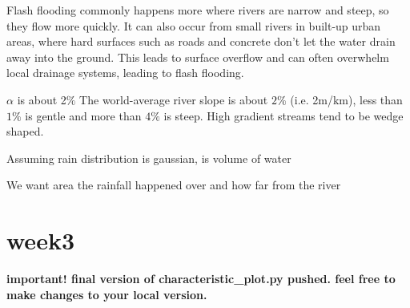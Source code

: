\documentclass[12pt]{article}
\begin{document}
Flash flooding commonly happens more where rivers are narrow and steep, so they flow more quickly. It can also occur from small rivers in built-up urban areas, where hard surfaces such as roads and concrete don't let the water drain away into the ground. This leads to surface overflow and can often overwhelm local drainage systems, leading to flash flooding.

$\alpha$ is about 2$\%$
The world-average river slope is about $2\%$ (i.e. 2m/km), less than $1\%$ is gentle and more than $4\%$ is steep.
High gradient streams tend to be wedge shaped.


Assuming rain distribution is gaussian, is volume of water

We want area the rainfall happened over and how far from the river
\section{week3 }
\textbf{important! final version of characteristic_plot.py pushed. feel free to make changes to your local version.}
\end{document}
